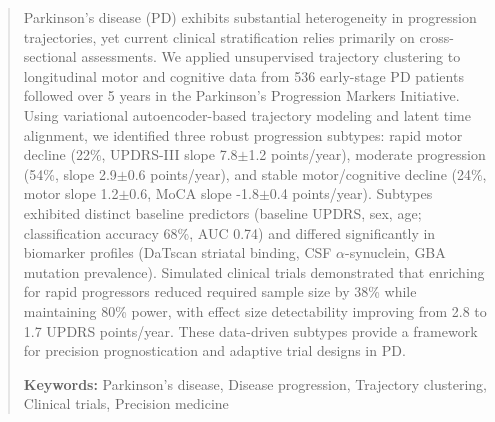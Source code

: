 \begin{abstract}
Parkinson's disease (PD) exhibits substantial heterogeneity in progression trajectories, yet current clinical stratification relies primarily on cross-sectional assessments. We applied unsupervised trajectory clustering to longitudinal motor and cognitive data from 536 early-stage PD patients followed over 5 years in the Parkinson's Progression Markers Initiative. Using variational autoencoder-based trajectory modeling and latent time alignment, we identified three robust progression subtypes: rapid motor decline (22\%, UPDRS-III slope 7.8$\pm$1.2 points/year), moderate progression (54\%, slope 2.9$\pm$0.6 points/year), and stable motor/cognitive decline (24\%, motor slope 1.2$\pm$0.6, MoCA slope -1.8$\pm$0.4 points/year). Subtypes exhibited distinct baseline predictors (baseline UPDRS, sex, age; classification accuracy 68\%, AUC 0.74) and differed significantly in biomarker profiles (DaTscan striatal binding, CSF $\alpha$-synuclein, GBA mutation prevalence). Simulated clinical trials demonstrated that enriching for rapid progressors reduced required sample size by 38\% while maintaining 80\% power, with effect size detectability improving from 2.8 to 1.7 UPDRS points/year. These data-driven subtypes provide a framework for precision prognostication and adaptive trial designs in PD.

\noindent\textbf{Keywords:} Parkinson's disease, Disease progression, Trajectory clustering, Clinical trials, Precision medicine
\end{abstract}
